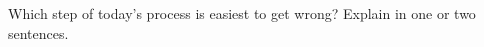 \begin{reflectionbox}
Which step of today's process is easiest to get wrong? Explain in one or two sentences.\par
\writeline\par\writeline
\end{reflectionbox}
